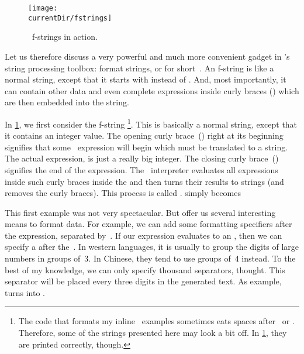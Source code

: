 \begin{figure}%
\centering%
\texttt{[image: \\currentDir/fstrings]}%
\caption{\python\ f-strings in action.}%
\label{fig:fstrings}%
\end{figure}

Let us therefore discuss a very powerful and much more convenient gadget in \python's string processing toolbox: format strings, or  for short~\cite{PSF2024FSL,S2016P4LSI,M2017WAFSIPAHCIUT,B2023PFS}.
An f-string is like a normal string, except that it starts with  instead of .
And, most importantly, it can contain other data and even complete expressions inside curly braces (\pythonIdx{\textbraceleft}\pythonIdx{\textbraceright}) which are then embedded into the string.%
%
\begin{sloppypar}%
In \cref{fig:fstrings}, we first consider the f-string \footnote{
The code that formats my inline \python\ examples sometimes eats spaces after \textbraceleft\ or \textbraceright. %
Therefore, some of the strings presented here may look a bit off. %
In \cref{fig:fstrings}, they are printed correctly, though.}.
This is basically a normal string, except that it contains an integer value.
The opening curly brace~(\inQuotes{\textbraceleft}) right at its beginning signifies that some \python\ expression will begin which must be translated to a string.
The actual expression,  is just a really big integer.
The closing curly brace~(\inQuotes{\textbraceright}) signifies the end of the expression.
The \python\ interpreter evaluates all expressions inside such curly braces inside the  and then turns their results to strings (and removes the curly braces).
This process is called \emph{}.
 simply becomes %
\end{sloppypar}%
%
\begin{sloppypar}%
This first example was not very spectacular.
But  offer us several interesting means to format data.
For example, we can add some formatting specifiers after the expression, separated by~\pythonilIdx{:}.
If our expression evaluates to an , then we can specify a  after the~\pythonilIdx{:}.
In western languages, it is usually to group the digits of large numbers in groups of~3.
In Chinese, they tend to use groups of~4 instead.
To the best of my knowledge, we can only specify thousand separators, thought.
This separator will be placed every three digits in the generated text.
As example,  turns into .%
\end{sloppypar}%
